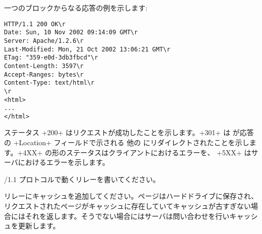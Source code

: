 %
一つのブロックからなる応答の例を示します:
\begin{lstlisting}
HTTP/1.1 200 OK\r
Date: Sun, 10 Nov 2002 09:14:09 GMT\r
Server: Apache/1.2.6\r
Last-Modified: Mon, 21 Oct 2002 13:06:21 GMT\r
ETag: "359-e0d-3db3fbcd"\r
Content-Length: 3597\r
Accept-Ranges: bytes\r
Content-Type: text/html\r
\r
<html>
...
</html>
\end{lstlisting}
ステータス \ml+200+ はリクエストが成功したことを示します。\ml+301+ は \URL が応答の \ml+Location+ フィールドで示される 他の \URL にリダイレクトされたことを示します。\ml+4XX+ の形のステータスはクライアントにおけるエラーを、 \ml+5XX+ はサーバにおけるエラーを示します。

\begin{exercise}[noanswer]
\label{ex/proxy-1.1}
\http/1.1 プロトコルで動くリレーを書いてください。
\end{exercise}

\begin{exercise}[noanswer]
リレーにキャッシュを追加してください。ページはハードドライブに保存され、リクエストされたページがキャッシュに存在していてキャッシュが古すぎない場合にはそれを返します。そうでない場合にはサーバは問い合わせを行いキャッシュを更新します。
\end{exercise}

